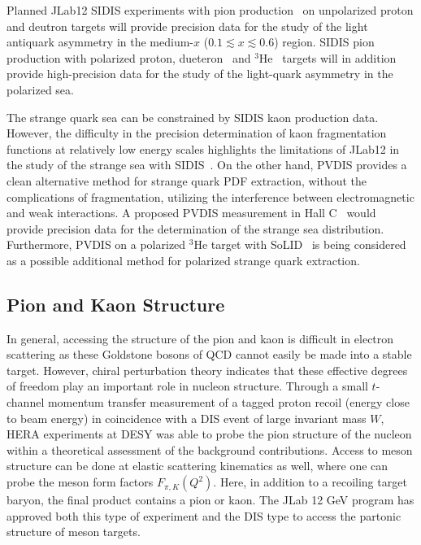 Planned JLab12 SIDIS experiments with pion production~\cite{SIDIS-SeaAsymmetry} on unpolarized proton and deutron targets will provide precision data for the study of the light antiquark asymmetry in the medium-$x$ ($0.1 \lesssim x \lesssim 0.6$) region. 
SIDIS pion production with polarized proton, dueteron~\cite{CLAS12spin} and $^3$He~\cite{SIDISHe3} targets will in addition provide high-precision data for the study of the light-quark asymmetry in the polarized sea.

The strange quark sea can be constrained by SIDIS kaon production data.
However, the difficulty in the precision determination of kaon fragmentation functions at relatively low energy scales %
highlights the limitations of JLab12 in the study of the strange sea with SIDIS~\cite{Moffat:2021dji}.
%
On the other hand, PVDIS provides a clean alternative method for strange quark PDF extraction, without the complications of fragmentation, utilizing the interference between electromagnetic and weak interactions.
A proposed PVDIS measurement in Hall C~\cite{PVPDF} would provide precision data for the determination of the strange sea distribution.
%
Furthermore, PVDIS on a polarized $^3$He target with SoLID~\cite{PVDIS_polHe3} is being considered as a possible additional method for polarized strange quark extraction.

\subsection{Pion and Kaon Structure} 
\label{sec:PionKaonStructure}

In general, accessing the structure of the pion and kaon is difficult in electron scattering as these Goldstone bosons of QCD cannot easily be made into a stable target. However, chiral perturbation theory indicates that these effective degrees of freedom play an important role in nucleon structure. Through a small $t$-channel momentum transfer measurement of a tagged proton recoil (energy close to beam energy) in coincidence with a DIS event of large invariant mass $W$, HERA experiments at DESY was able to probe the pion structure of the nucleon within a theoretical assessment of the background contributions. Access to meson structure can be done at elastic scattering kinematics as well, where one can probe the meson form factors $F_{\pi, K}(Q^2)$. Here, in addition to a recoiling target baryon, the final product contains a pion or kaon. The JLab 12 GeV program has approved both this type of experiment and the DIS type to access the partonic structure of meson targets. 

